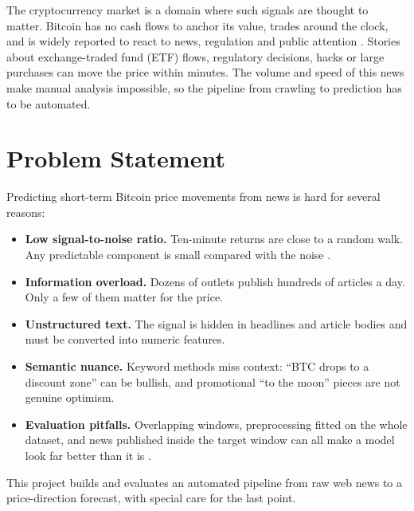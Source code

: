 \documentclass[12pt,a4paper,oneside]{report}
\begin{document}
The cryptocurrency market is a domain where such signals are thought to
matter. Bitcoin has no cash flows to anchor its value, trades around the
clock, and is widely reported to react to news, regulation and public
attention \citep{kristoufek2013bitcoin,garcia2015social}. Stories about
exchange-traded fund (ETF) flows, regulatory decisions, hacks or large
purchases can move the price within minutes. The volume and speed of this
news make manual analysis impossible, so the pipeline from crawling to
prediction has to be automated.

\section{Problem Statement}
Predicting short-term Bitcoin price movements from news is hard for several
reasons:
\begin{itemize}
  \item \textbf{Low signal-to-noise ratio.} Ten-minute returns are close to
        a random walk. Any predictable component is small compared with
        the noise \citep{fama1970efficient}.
  \item \textbf{Information overload.} Dozens of outlets publish hundreds of
        articles a day. Only a few of them matter for the price.
  \item \textbf{Unstructured text.} The signal is hidden in headlines and
        article bodies and must be converted into numeric features.
  \item \textbf{Semantic nuance.} Keyword methods miss context: ``BTC drops
        to a discount zone'' can be bullish, and promotional ``to the moon''
        pieces are not genuine optimism.
  \item \textbf{Evaluation pitfalls.} Overlapping windows, preprocessing
        fitted on the whole dataset, and news published inside the target
        window can all make a model look far better than it is
        \citep{lopezdeprado2018advances}.
\end{itemize}
This project builds and evaluates an automated pipeline from raw web news to
a price-direction forecast, with special care for the last point.
\end{document}
